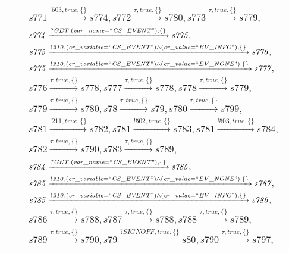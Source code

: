 \begin{tabular}{lcp{350px}}
& & $\mathit{s771}\xrightarrow{\mathit{!503}, \mathit{true}, \{\}}\mathit{s774},\mathit{s772}\xrightarrow{\mathit{\tau}, \mathit{true}, \{\}}\mathit{s780},\mathit{s773}\xrightarrow{\mathit{\tau}, \mathit{true}, \{\}}\mathit{s779},$ \\
& & $\mathit{s774}\xrightarrow{\mathit{?GET}, \mathit{(var\_name = ``CS\_EVENT")}, \{\}}\mathit{s775},$ \\
& & $\mathit{s775}\xrightarrow{\mathit{!210}, \mathit{(cr\_variable = ``CS\_EVENT") \land (cr\_value = ``EV\_INFO")}, \{\}}\mathit{s776},$ \\
& & $\mathit{s775}\xrightarrow{\mathit{!210}, \mathit{(cr\_variable = ``CS\_EVENT") \land (cr\_value = ``EV\_NONE")}, \{\}}\mathit{s777},$ \\
& & $\mathit{s776}\xrightarrow{\mathit{\tau}, \mathit{true}, \{\}}\mathit{s778},\mathit{s777}\xrightarrow{\mathit{\tau}, \mathit{true}, \{\}}\mathit{s778},\mathit{s778}\xrightarrow{\mathit{\tau}, \mathit{true}, \{\}}\mathit{s779},$ \\
& & $\mathit{s779}\xrightarrow{\mathit{\tau}, \mathit{true}, \{\}}\mathit{s780},\mathit{s78}\xrightarrow{\mathit{\tau}, \mathit{true}, \{\}}\mathit{s79},\mathit{s780}\xrightarrow{\mathit{\tau}, \mathit{true}, \{\}}\mathit{s799},$ \\
& & $\mathit{s781}\xrightarrow{\mathit{!211}, \mathit{true}, \{\}}\mathit{s782},\mathit{s781}\xrightarrow{\mathit{!502}, \mathit{true}, \{\}}\mathit{s783},\mathit{s781}\xrightarrow{\mathit{!503}, \mathit{true}, \{\}}\mathit{s784},$ \\
& & $\mathit{s782}\xrightarrow{\mathit{\tau}, \mathit{true}, \{\}}\mathit{s790},\mathit{s783}\xrightarrow{\mathit{\tau}, \mathit{true}, \{\}}\mathit{s789},$ \\
& & $\mathit{s784}\xrightarrow{\mathit{?GET}, \mathit{(var\_name = ``CS\_EVENT")}, \{\}}\mathit{s785},$ \\
& & $\mathit{s785}\xrightarrow{\mathit{!210}, \mathit{(cr\_variable = ``CS\_EVENT") \land (cr\_value = ``EV\_NONE")}, \{\}}\mathit{s787},$ \\
& & $\mathit{s785}\xrightarrow{\mathit{!210}, \mathit{(cr\_variable = ``CS\_EVENT") \land (cr\_value = ``EV\_INFO")}, \{\}}\mathit{s786},$ \\
& & $\mathit{s786}\xrightarrow{\mathit{\tau}, \mathit{true}, \{\}}\mathit{s788},\mathit{s787}\xrightarrow{\mathit{\tau}, \mathit{true}, \{\}}\mathit{s788},\mathit{s788}\xrightarrow{\mathit{\tau}, \mathit{true}, \{\}}\mathit{s789},$ \\
& & $\mathit{s789}\xrightarrow{\mathit{\tau}, \mathit{true}, \{\}}\mathit{s790},\mathit{s79}\xrightarrow{\mathit{?SIGNOFF}, \mathit{true}, \{\}}\mathit{s80},\mathit{s790}\xrightarrow{\mathit{\tau}, \mathit{true}, \{\}}\mathit{s797},$ \\
\end{tabular}

